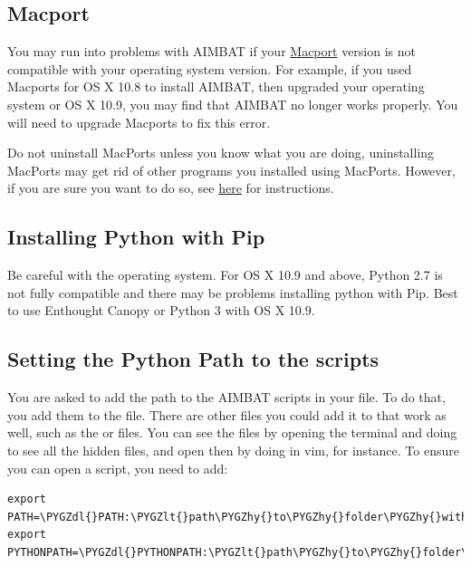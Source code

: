 \documentclass[letterpaper,10pt,english]{sphinxmanual}
\def\PYGZlt{\char`\<}
\def\PYGZgt{\char`\>}
\def\PYGZdl{\char`\$}
\def\PYGZhy{\char`\-}
\begin{document}
\subsection{Macport}
\label{docfiles/install_dependencies:macport}
You may run into problems with AIMBAT if your \href{http://www.macports.org/}{Macport} version is not compatible with your operating system version. For example, if you used Macports for OS X 10.8 to install AIMBAT, then upgraded your operating system or OS X 10.9, you may find that AIMBAT no longer works properly. You will need to upgrade Macports to fix this error.

Do not uninstall MacPorts unless you know what you are doing, uninstalling MacPorts may get rid of other programs you installed using MacPorts. However, if you are sure you want to do so, see \href{https://guide.macports.org/chunked/installing.macports.uninstalling.html}{here} for instructions.


\subsection{Installing Python with Pip}
\label{docfiles/install_dependencies:installing-python-with-pip}
Be careful with the operating system. For OS X 10.9 and above, Python 2.7 is not fully compatible and there may be problems installing python with Pip. Best to use Enthought Canopy or Python 3 with OS X 10.9.


\subsection{Setting the Python Path to the scripts}
\label{docfiles/install_dependencies:setting-the-python-path-to-the-scripts}
You are asked to add the path to the AIMBAT scripts in your file. To do that, you add them to the  file. There are other files you could add it to that work as well, such as the  or  files. You can see the files by opening the terminal and doing  to see all the hidden files, and open then by doing  in vim, for instance.
To ensure you can open a script, you need to add:

\begin{Verbatim}[commandchars=\\\{\}]
export PATH=\PYGZdl{}PATH:\PYGZlt{}path\PYGZhy{}to\PYGZhy{}folder\PYGZhy{}with\PYGZhy{}scripts\PYGZgt{}
export PYTHONPATH=\PYGZdl{}PYTHONPATH:\PYGZlt{}path\PYGZhy{}to\PYGZhy{}folder\PYGZhy{}with\PYGZhy{}scripts\PYGZgt{}
\end{Verbatim}
\end{document}
